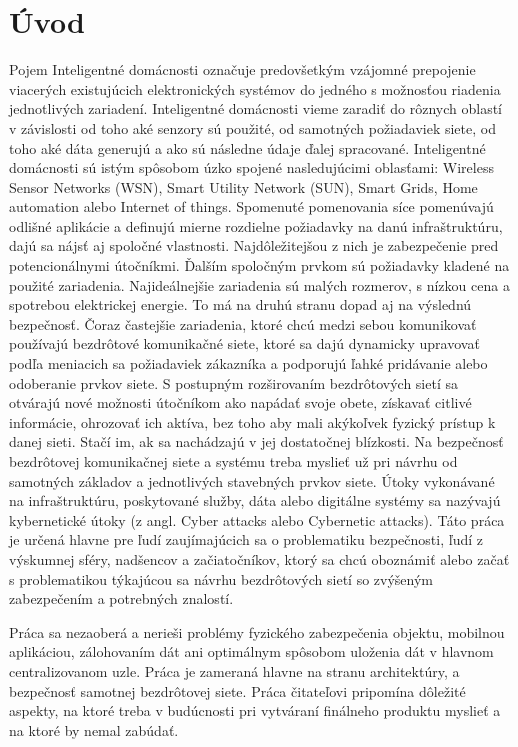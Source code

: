 \documentclass[12pt,a4paper,oneside,openright]{report}
\begin{document}

\newpage 
{}
\setcounter{page}{1}


\chapter{Úvod}
Pojem Inteligentné domácnosti označuje predovšetkým vzájomné prepojenie viacerých existujúcich elektronických systémov do jedného s možnosťou riadenia jednotlivých zariadení.
Inteligentné domácnosti vieme zaradiť do rôznych oblastí v závislosti od toho aké senzory sú použité, od samotných požiadaviek siete, od toho aké dáta generujú a ako sú následne údaje ďalej spracované. Inteligentné domácnosti sú istým spôsobom úzko spojené nasledujúcimi oblasťami: Wireless Sensor Networks (WSN), Smart Utility Network (SUN), Smart Grids, Home automation alebo Internet of things. Spomenuté pomenovania síce pomenúvajú odlišné aplikácie a definujú mierne rozdielne požiadavky na danú infraštruktúru, dajú sa nájsť aj spoločné vlastnosti. Najdôležitejšou z nich je zabezpečenie pred potencionálnymi útočníkmi.
Ďalším spoločným prvkom sú požiadavky kladené na použité zariadenia. Najideálnejšie zariadenia sú malých rozmerov, s nízkou cena a spotrebou elektrickej energie. To má na druhú stranu dopad aj na výslednú bezpečnosť.
Čoraz častejšie zariadenia, ktoré chcú medzi sebou komunikovať používajú bezdrôtové komunikačné siete, ktoré sa dajú dynamicky upravovať podľa meniacich sa požiadaviek zákazníka a podporujú ľahké pridávanie alebo odoberanie prvkov siete.
S postupným rozširovaním bezdrôtových sietí sa otvárajú nové možnosti útočníkom ako napádať svoje obete, získavať citlivé informácie, ohrozovať ich aktíva, bez toho aby mali akýkoľvek fyzický prístup k danej sieti. Stačí im, ak sa nachádzajú v jej dostatočnej blízkosti.
Na bezpečnosť bezdrôtovej komunikačnej siete a systému treba myslieť už pri návrhu od samotných základov a jednotlivých stavebných prvkov siete.
Útoky vykonávané na infraštruktúru, poskytované služby, dáta alebo digitálne systémy sa nazývajú kybernetické útoky (z angl. Cyber attacks alebo Cybernetic attacks).
Táto práca je určená hlavne pre ľudí zaujímajúcich sa o problematiku bezpečnosti, ľudí z výskumnej sféry, nadšencov a začiatočníkov, ktorý sa chcú oboznámiť alebo začať s problematikou týkajúcou sa návrhu bezdrôtových sietí so zvýšeným zabezpečením a potrebných znalostí.

Práca sa nezaoberá a nerieši problémy fyzického zabezpečenia objektu, mobilnou aplikáciou, zálohovaním dát ani optimálnym spôsobom uloženia dát v hlavnom centralizovanom uzle. Práca je zameraná hlavne na stranu architektúry, a bezpečnosť samotnej bezdrôtovej siete. Práca čitateľovi pripomína dôležité aspekty, na ktoré treba v budúcnosti pri vytváraní finálneho produktu myslieť a na ktoré by nemal zabúdať.
\end{document}
